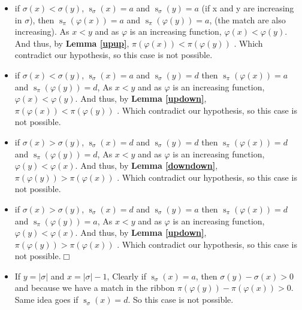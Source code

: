 \documentclass[a4paper]{llncs}
\newcommand{\ptext}{\pi}
\newcommand{\pmotif}{\sigma}
\DeclareMathOperator{\stripea}{s}
\newcommand{\stripe}[2]{\stripea_{{#1}}({#2})}
\newcommand{\dstep}{d}
\newcommand{\ustep}{a}
\begin{document}
		\begin{itemize}		
			\item if $\pmotif(x)<\pmotif(y)$, 
			$\stripe{\pmotif}{x}=\ustep$ 
			and $\stripe{\pmotif}{y}=\ustep$
			(if x and y are increasing in $\pmotif$),
			then $\stripe{\ptext}{\varphi(x)} =\ustep$ and $\stripe{\ptext}{\varphi(y)}=\ustep$,
			(the match are also increasing).
			As $x<y$ and as $\varphi$ is an increasing function, 
			$\varphi(x) < \varphi(y)$.
			And thus, by \textbf{Lemma \ref{upup}},
			$\ptext(\varphi(x)) < \ptext(\varphi(y))$ .
			Which contradict our hypothesis,
			so this case is not possible.
		
			\item if $\pmotif(x)<\pmotif(y)$, 
			$\stripe{\pmotif}{x}=\ustep$ 
			and $\stripe{\pmotif}{y}=\dstep$
			then $\stripe{\ptext}{\varphi(x)}=\ustep$ and $\stripe{\ptext}{\varphi(y)}=\dstep$,
			As $x<y$ and as $\varphi$ is an increasing function, 
			$\varphi(x) < \varphi(y)$.
			And thus, by \textbf{Lemma \ref{updown}},
			$\ptext(\varphi(x)) < \ptext(\varphi(y))$ .
			Which contradict our hypothesis,
			so this case is not possible.			

			\item if $\pmotif(x)>\pmotif(y)$, 
			$\stripe{\pmotif}{x}=\dstep$ 
			and $\stripe{\pmotif}{y}=\dstep$
			then $\stripe{\ptext}{\varphi(x)}=\dstep$ and $\stripe{\ptext}{\varphi(y)}=\dstep$,
			As $x<y$ and as $\varphi$ is an increasing function, 
			$\varphi(y) < \varphi(x)$.
			And thus, by \textbf{Lemma \ref{downdown}},
			$\ptext(\varphi(y)) > \ptext(\varphi(x))$ .
			Which contradict our hypothesis,
			so this case is not possible.
			
			\item if $\pmotif(x)>\pmotif(y)$, 
			$\stripe{\pmotif}{x}=\dstep$ 
			and $\stripe{\pmotif}{y}=\ustep$
			then $\stripe{\ptext}{\varphi(x)}=\dstep$ and $\stripe{\ptext}{\varphi(y)}=\ustep$,
			As $x<y$ and as $\varphi$ is an increasing function, 
			$\varphi(y) < \varphi(x)$.
			And thus, by \textbf{Lemma \ref{updown}},
			$\ptext(\varphi(y)) > \ptext(\varphi(x))$ .
			Which contradict our hypothesis,
			so this case is not possible.$\Box$
			
			\item If $y = |\pmotif|$ and $x=|\pmotif|-1$,
			Clearly if $\stripe{\pmotif}{x}=\ustep$,
			then $\pmotif(y)-\pmotif(x)>0$ 
			and because we have a match in the ribbon
			$\ptext(\varphi(y))-\ptext(\varphi(x))>0$.
			Same idea goes if $\stripe{\pmotif}{x}=\dstep$.
			So this case is not possible.
			

\end{itemize}
\end{document}
